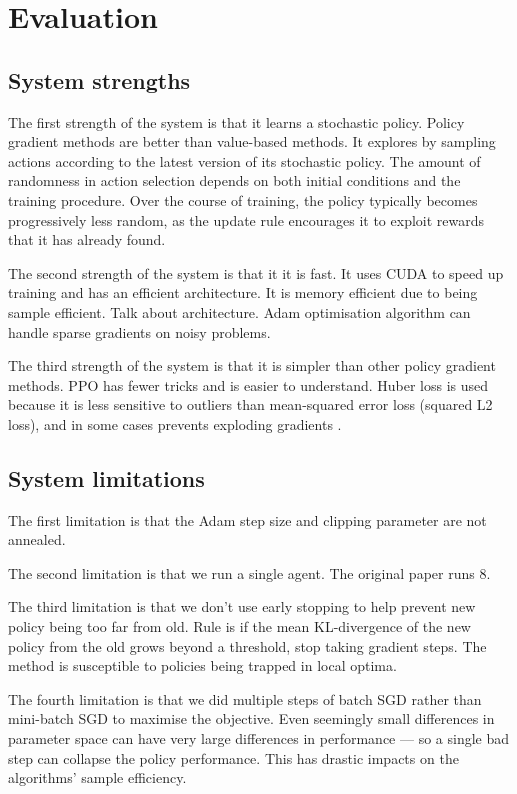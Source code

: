 \documentclass[12pt,a4paper]{article}
\begin{document}
\section{Evaluation}
\subsection{System strengths} 
The first strength of the system is that it learns a stochastic policy. Policy gradient methods are better than value-based methods. It explores by sampling actions according to the latest version of its stochastic policy. The amount of randomness in action selection depends on both initial conditions and the training procedure. Over the course of training, the policy typically becomes progressively less random, as the update rule encourages it to exploit rewards that it has already found. 

The second strength of the system is that it it is fast. It uses CUDA to speed up training and has an efficient architecture. It is memory efficient due to being sample efficient. Talk about architecture. Adam optimisation algorithm \cite{kingma2017adam} can handle sparse gradients on noisy problems.

The third strength of the system is that it is simpler than other policy gradient methods. PPO has fewer tricks and is easier to understand. Huber loss is used because it is less sensitive to outliers than mean-squared error loss (squared L2 loss), and in some cases prevents exploding gradients \cite{DBLP:journals/corr/Girshick15}.

\subsection{System limitations}
The first limitation is that the Adam step size and clipping parameter are not annealed.

The second limitation is that we run a single agent. The original paper runs 8. 

The third limitation is that we don't use early stopping to help prevent new policy being too far from old. Rule is if the mean KL-divergence of the new policy from the old grows beyond a threshold, stop taking gradient steps. The method is susceptible to policies being trapped in local optima.

The fourth limitation is that we did multiple steps of batch SGD rather than mini-batch SGD to maximise the objective. Even seemingly small differences in parameter space can have very large differences in performance --- so a single bad step can collapse the policy performance. This has drastic impacts on the algorithms' sample efficiency.
\end{document}
